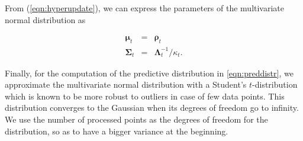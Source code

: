 From (\ref{eqn:hyperupdate}), we can express the parameters of the
multivariate normal distribution as

\begin{eqnarray}
\label{eqn:ssmvn}
\boldsymbol{\mu}_t &=& \boldsymbol{\rho}_t\nonumber\\
\boldsymbol{\Sigma}_t &=& \boldsymbol{\Lambda}_t^{-1} / \kappa_t.
\end{eqnarray}

Finally, for the computation of the predictive distribution in
\eqref{eqn:preddistr}, we approximate the multivariate normal distribution with
a Student's $t$-distribution which is known to be more robust to outliers in
case of few data points. This distribution converges to the Gaussian when its
degrees of freedom go to infinity. We use the number of processed points as the
degrees of freedom for the distribution, so as to have a bigger variance at the
beginning.
